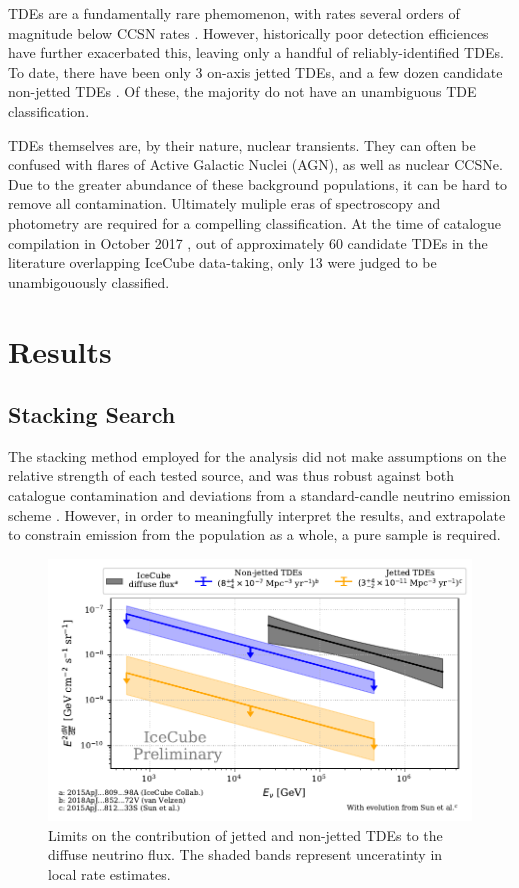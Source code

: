 \documentclass{PoS}
\begin{document}
TDEs are a fundamentally rare phemomenon, with rates several orders of magnitude below CCSN rates \cite{vanVelzen:2017qum}. However, historically poor detection efficiences have further exacerbated this, leaving only a handful of reliably-identified TDEs. To date, there have been only 3 on-axis jetted TDEs, and a few dozen candidate non-jetted TDEs \cite{Komossa:2015qya, Auchettl:2016qfa}. Of these, the majority do not have an unambiguous TDE classification. 

TDEs themselves are, by their nature, nuclear transients. They can often be confused with flares of Active Galactic Nuclei (AGN), as well as nuclear CCSNe. Due to the greater abundance of these background populations, it can be hard to remove all contamination. Ultimately muliple eras of spectroscopy and photometry are required for a compelling classification. At the time of catalogue compilation in October 2017 \cite{Auchettl:2016qfa}, out of approximately 60 candidate TDEs in the literature overlapping IceCube data-taking, only 13 were judged to be unambigouously classified. 

\section{Results}
\subsection{Stacking Search}

The stacking method employed for the analysis did not make assumptions on the relative strength of each tested source, and was thus robust against both catalogue contamination and deviations from a standard-candle neutrino emission scheme \cite{Stasik2018Search}. However, in order to meaningfully interpret the results, and extrapolate to constrain emission from the population as a whole, a pure sample is required. 

\begin{figure}[!ht]
	\centering \includegraphics[width=\textwidth]{figures/diffuse_flux_global_fit}
	\caption{Limits on the contribution of jetted and non-jetted TDEs to the diffuse neutrino flux. The shaded bands represent unceratinty in local rate estimates.}
	\label{fig:DiffuseFlux}
\end{figure}
\end{document}
